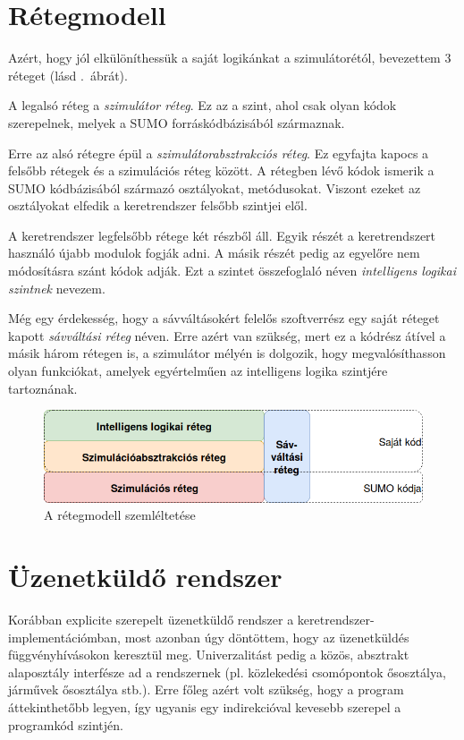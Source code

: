 \documentclass{article}
\begin{document}
	\section{Rétegmodell}
		Azért, hogy jól elkülöníthessük a saját logikánkat a szimulátorétól, bevezettem 3 réteget (lásd .~ábrát).
		
		A legalsó réteg a \emph{szimulátor réteg}. Ez az a szint, ahol csak olyan kódok szerepelnek, melyek a SUMO forráskódbázisából származnak.
		
		Erre az alsó rétegre épül a \emph{szimulátorabsztrakciós réteg}. Ez egyfajta kapocs a felsőbb rétegek és a szimulációs réteg között. A rétegben lévő kódok ismerik a SUMO kódbázisából származó osztályokat, metódusokat. Viszont ezeket az osztályokat elfedik a keretrendszer felsőbb szintjei elől.
		
		A keretrendszer legfelsőbb rétege két részből áll. Egyik részét a keretrendszert használó újabb modulok fogják adni. A másik részét pedig az egyelőre nem módosításra szánt kódok adják. Ezt a szintet összefoglaló néven \emph{intelligens logikai szintnek} nevezem.
		
		Még egy érdekesség, hogy a sávváltásokért felelős szoftverrész egy saját réteget kapott \emph{sávváltási réteg} néven. Erre azért van szükség, mert ez a kódrész átível a másik három rétegen is, a szimulátor mélyén is dolgozik, hogy megvalósíthasson olyan funkciókat, amelyek egyértelműen az intelligens logika szintjére tartoznának.
		
		\begin{figure}[h]
			\centering
			\includegraphics[width=1.0\textwidth]{retegmodell.png} 
			\caption{A rétegmodell szemléltetése}
			\label{pic:reteg}
		\end{figure}
		
	\section{Üzenetküldő rendszer}
		Korábban explicite szerepelt üzenetküldő rendszer a keretrendszer-implementációmban, most azonban úgy döntöttem, hogy az üzenetküldés függvényhívásokon keresztül meg. Univerzalitást pedig a közös, absztrakt alaposztály interfésze ad a rendszernek (pl. közlekedési csomópontok ősosztálya, járművek ősosztálya stb.). Erre főleg azért volt szükség, hogy a program áttekinthetőbb legyen, így ugyanis egy indirekcióval kevesebb szerepel a programkód szintjén.
		
\end{document}
